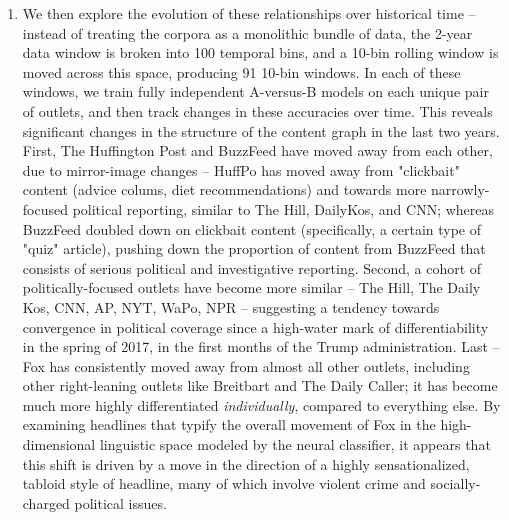 \documentclass{scrartcl}
\begin{document}
\begin{enumerate}
\item We then explore the evolution of these relationships over historical time -- instead of treating the corpora as a monolithic bundle of data, the 2-year data window is broken into 100 temporal bins, and a 10-bin rolling window is moved across this space, producing 91 10-bin windows. In each of these windows, we train fully independent A-versus-B models on each unique pair of outlets, and then track changes in these accuracies over time. This reveals significant changes in the structure of the content graph in the last two years. First, The Huffington Post and BuzzFeed have moved away from each other, due to mirror-image changes -- HuffPo has moved away from "clickbait" content (advice colums, diet recommendations) and towards more narrowly-focused political reporting, similar to The Hill, DailyKos, and CNN; whereas BuzzFeed doubled down on clickbait content (specifically, a certain type of "quiz" article), pushing down the proportion of content from BuzzFeed that consists of serious political and investigative reporting. Second, a cohort of politically-focused outlets have become more similar -- The Hill, The Daily Kos, CNN, AP, NYT, WaPo, NPR -- suggesting a tendency towards convergence in political coverage since a high-water mark of differentiability in the spring of 2017, in the first months of the Trump administration. Last -- Fox has consistently moved away from almost all other outlets, including other right-leaning outlets like Breitbart and The Daily Caller; it has become much more highly differentiated \textit{individually}, compared to everything else. By examining headlines that typify the overall movement of Fox in the high-dimensional linguistic space modeled by the neural classifier, it appears that this shift is driven by a move in the direction of a highly sensationalized, tabloid style of headline, many of which involve violent crime and socially-charged political issues.


\end{enumerate}
\end{document}
